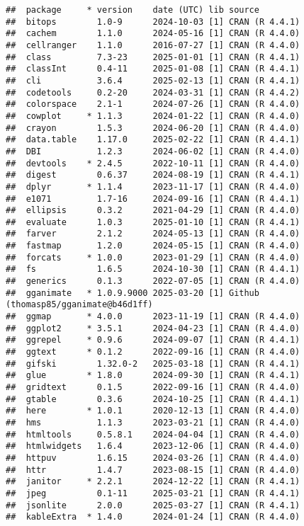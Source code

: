 \documentclass[
]{article}
\begin{document}
\begin{verbatim}
##  package     * version    date (UTC) lib source
##  bitops        1.0-9      2024-10-03 [1] CRAN (R 4.4.1)
##  cachem        1.1.0      2024-05-16 [1] CRAN (R 4.4.0)
##  cellranger    1.1.0      2016-07-27 [1] CRAN (R 4.4.0)
##  class         7.3-23     2025-01-01 [1] CRAN (R 4.4.1)
##  classInt      0.4-11     2025-01-08 [1] CRAN (R 4.4.1)
##  cli           3.6.4      2025-02-13 [1] CRAN (R 4.4.1)
##  codetools     0.2-20     2024-03-31 [1] CRAN (R 4.4.2)
##  colorspace    2.1-1      2024-07-26 [1] CRAN (R 4.4.0)
##  cowplot     * 1.1.3      2024-01-22 [1] CRAN (R 4.4.0)
##  crayon        1.5.3      2024-06-20 [1] CRAN (R 4.4.0)
##  data.table    1.17.0     2025-02-22 [1] CRAN (R 4.4.1)
##  DBI           1.2.3      2024-06-02 [1] CRAN (R 4.4.0)
##  devtools    * 2.4.5      2022-10-11 [1] CRAN (R 4.4.0)
##  digest        0.6.37     2024-08-19 [1] CRAN (R 4.4.1)
##  dplyr       * 1.1.4      2023-11-17 [1] CRAN (R 4.4.0)
##  e1071         1.7-16     2024-09-16 [1] CRAN (R 4.4.1)
##  ellipsis      0.3.2      2021-04-29 [1] CRAN (R 4.4.0)
##  evaluate      1.0.3      2025-01-10 [1] CRAN (R 4.4.1)
##  farver        2.1.2      2024-05-13 [1] CRAN (R 4.4.0)
##  fastmap       1.2.0      2024-05-15 [1] CRAN (R 4.4.0)
##  forcats     * 1.0.0      2023-01-29 [1] CRAN (R 4.4.0)
##  fs            1.6.5      2024-10-30 [1] CRAN (R 4.4.1)
##  generics      0.1.3      2022-07-05 [1] CRAN (R 4.4.0)
##  gganimate   * 1.0.9.9000 2025-03-20 [1] Github (thomasp85/gganimate@b46d1ff)
##  ggmap       * 4.0.0      2023-11-19 [1] CRAN (R 4.4.0)
##  ggplot2     * 3.5.1      2024-04-23 [1] CRAN (R 4.4.0)
##  ggrepel     * 0.9.6      2024-09-07 [1] CRAN (R 4.4.1)
##  ggtext      * 0.1.2      2022-09-16 [1] CRAN (R 4.4.0)
##  gifski        1.32.0-2   2025-03-18 [1] CRAN (R 4.4.1)
##  glue        * 1.8.0      2024-09-30 [1] CRAN (R 4.4.1)
##  gridtext      0.1.5      2022-09-16 [1] CRAN (R 4.4.0)
##  gtable        0.3.6      2024-10-25 [1] CRAN (R 4.4.1)
##  here        * 1.0.1      2020-12-13 [1] CRAN (R 4.4.0)
##  hms           1.1.3      2023-03-21 [1] CRAN (R 4.4.0)
##  htmltools     0.5.8.1    2024-04-04 [1] CRAN (R 4.4.0)
##  htmlwidgets   1.6.4      2023-12-06 [1] CRAN (R 4.4.0)
##  httpuv        1.6.15     2024-03-26 [1] CRAN (R 4.4.0)
##  httr          1.4.7      2023-08-15 [1] CRAN (R 4.4.0)
##  janitor     * 2.2.1      2024-12-22 [1] CRAN (R 4.4.1)
##  jpeg          0.1-11     2025-03-21 [1] CRAN (R 4.4.1)
##  jsonlite      2.0.0      2025-03-27 [1] CRAN (R 4.4.1)
##  kableExtra  * 1.4.0      2024-01-24 [1] CRAN (R 4.4.0)

\end{verbatim}
\end{document}
